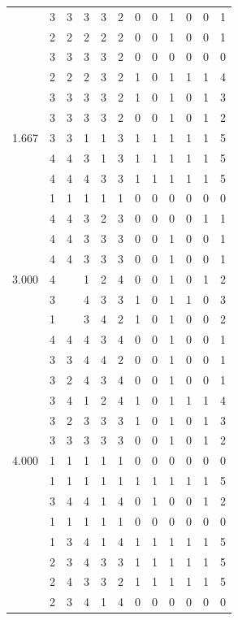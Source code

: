 \documentclass[]{book}
\theoremstyle{definition}
\theoremstyle{definition}
\theoremstyle{definition}
\theoremstyle{remark}
\begin{document}
\begin{table}
{\begin{tabular}[t]{rrrrrrrrrrrr}
 & 3 & 3 & 3 & 3 & 2 & 0 & 0 & 1 & 0 & 0 & 1\\
 & 2 & 2 & 2 & 2 & 2 & 0 & 0 & 1 & 0 & 0 & 1\\
 & 3 & 3 & 3 & 3 & 2 & 0 & 0 & 0 & 0 & 0 & 0\\
 & 2 & 2 & 2 & 3 & 2 & 1 & 0 & 1 & 1 & 1 & 4\\
 & 3 & 3 & 3 & 3 & 2 & 1 & 0 & 1 & 0 & 1 & 3\\
 & 3 & 3 & 3 & 3 & 2 & 0 & 0 & 1 & 0 & 1 & 2\\
1.667 & 3 & 3 & 1 & 1 & 3 & 1 & 1 & 1 & 1 & 1 & 5\\
 & 4 & 4 & 3 & 1 & 3 & 1 & 1 & 1 & 1 & 1 & 5\\
 & 4 & 4 & 4 & 3 & 3 & 1 & 1 & 1 & 1 & 1 & 5\\
 & 1 & 1 & 1 & 1 & 1 & 0 & 0 & 0 & 0 & 0 & 0\\
 & 4 & 4 & 3 & 2 & 3 & 0 & 0 & 0 & 0 & 1 & 1\\
 & 4 & 4 & 3 & 3 & 3 & 0 & 0 & 1 & 0 & 0 & 1\\
 & 4 & 4 & 3 & 3 & 3 & 0 & 0 & 1 & 0 & 0 & 1\\
3.000 & 4 &  & 1 & 2 & 4 & 0 & 0 & 1 & 0 & 1 & 2\\
 & 3 &  & 4 & 3 & 3 & 1 & 0 & 1 & 1 & 0 & 3\\
 & 1 &  & 3 & 4 & 2 & 1 & 0 & 1 & 0 & 0 & 2\\
 & 4 & 4 & 4 & 3 & 4 & 0 & 0 & 1 & 0 & 0 & 1\\
 & 3 & 3 & 4 & 4 & 2 & 0 & 0 & 1 & 0 & 0 & 1\\
 & 3 & 2 & 4 & 3 & 4 & 0 & 0 & 1 & 0 & 0 & 1\\
 & 3 & 4 & 1 & 2 & 4 & 1 & 0 & 1 & 1 & 1 & 4\\
 & 3 & 2 & 3 & 3 & 3 & 1 & 0 & 1 & 0 & 1 & 3\\
 & 3 & 3 & 3 & 3 & 3 & 0 & 0 & 1 & 0 & 1 & 2\\
4.000 & 1 & 1 & 1 & 1 & 1 & 0 & 0 & 0 & 0 & 0 & 0\\
 & 1 & 1 & 1 & 1 & 1 & 1 & 1 & 1 & 1 & 1 & 5\\
 & 3 & 4 & 4 & 1 & 4 & 0 & 1 & 0 & 0 & 1 & 2\\
 & 1 & 1 & 1 & 1 & 1 & 0 & 0 & 0 & 0 & 0 & 0\\
 & 1 & 3 & 4 & 1 & 4 & 1 & 1 & 1 & 1 & 1 & 5\\
 & 2 & 3 & 4 & 3 & 3 & 1 & 1 & 1 & 1 & 1 & 5\\
 & 2 & 4 & 3 & 3 & 2 & 1 & 1 & 1 & 1 & 1 & 5\\
 & 2 & 3 & 4 & 1 & 4 & 0 & 0 & 0 & 0 & 0 & 0\\

\end{tabular}}
\end{table}
\end{document}
